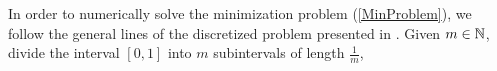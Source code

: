 \documentclass[../capacities_main.tex]{subfiles}
\begin{document}
	
	
	In order to numerically solve the minimization problem (\ref{MinProblem}), we follow the general lines of the discretized problem presented in \cite{gjthesis}. 
	Given $m\in{\mathbb N}$, divide the interval $[0,1]$ into $m$ subintervals of length $\frac{1}{m}$,  
	
\end{document}
